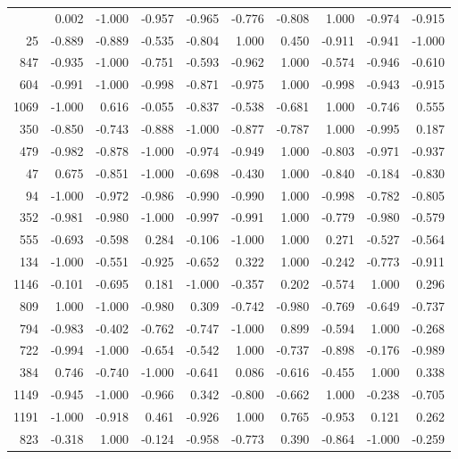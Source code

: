 \begin{longtable}{rrrrrrrrrr}
\bottomrule
\endlastfoot
   558 &  0.002 & -1.000 & -0.957 & -0.965 & -0.776 & -0.808 &  1.000 & -0.974 & -0.915 \\
    25 & -0.889 & -0.889 & -0.535 & -0.804 &  1.000 &  0.450 & -0.911 & -0.941 & -1.000 \\
   847 & -0.935 & -1.000 & -0.751 & -0.593 & -0.962 &  1.000 & -0.574 & -0.946 & -0.610 \\
   604 & -0.991 & -1.000 & -0.998 & -0.871 & -0.975 &  1.000 & -0.998 & -0.943 & -0.915 \\
  1069 & -1.000 &  0.616 & -0.055 & -0.837 & -0.538 & -0.681 &  1.000 & -0.746 &  0.555 \\
   350 & -0.850 & -0.743 & -0.888 & -1.000 & -0.877 & -0.787 &  1.000 & -0.995 &  0.187 \\
   479 & -0.982 & -0.878 & -1.000 & -0.974 & -0.949 &  1.000 & -0.803 & -0.971 & -0.937 \\
    47 &  0.675 & -0.851 & -1.000 & -0.698 & -0.430 &  1.000 & -0.840 & -0.184 & -0.830 \\
    94 & -1.000 & -0.972 & -0.986 & -0.990 & -0.990 &  1.000 & -0.998 & -0.782 & -0.805 \\
   352 & -0.981 & -0.980 & -1.000 & -0.997 & -0.991 &  1.000 & -0.779 & -0.980 & -0.579 \\
   555 & -0.693 & -0.598 &  0.284 & -0.106 & -1.000 &  1.000 &  0.271 & -0.527 & -0.564 \\
   134 & -1.000 & -0.551 & -0.925 & -0.652 &  0.322 &  1.000 & -0.242 & -0.773 & -0.911 \\
  1146 & -0.101 & -0.695 &  0.181 & -1.000 & -0.357 &  0.202 & -0.574 &  1.000 &  0.296 \\
   809 &  1.000 & -1.000 & -0.980 &  0.309 & -0.742 & -0.980 & -0.769 & -0.649 & -0.737 \\
   794 & -0.983 & -0.402 & -0.762 & -0.747 & -1.000 &  0.899 & -0.594 &  1.000 & -0.268 \\
   722 & -0.994 & -1.000 & -0.654 & -0.542 &  1.000 & -0.737 & -0.898 & -0.176 & -0.989 \\
   384 &  0.746 & -0.740 & -1.000 & -0.641 &  0.086 & -0.616 & -0.455 &  1.000 &  0.338 \\
  1149 & -0.945 & -1.000 & -0.966 &  0.342 & -0.800 & -0.662 &  1.000 & -0.238 & -0.705 \\
  1191 & -1.000 & -0.918 &  0.461 & -0.926 &  1.000 &  0.765 & -0.953 &  0.121 &  0.262 \\
   823 & -0.318 &  1.000 & -0.124 & -0.958 & -0.773 &  0.390 & -0.864 & -1.000 & -0.259 \\

\end{longtable}

